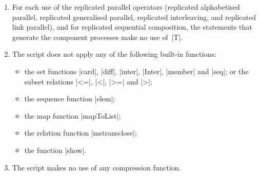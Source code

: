 \begin{definition}
\begin{enumerate}
\item\label{item:indexing} For each use of the replicated parallel operators
  (replicated alphabetised parallel, replicated generalised parallel,
  replicated interleaving, and replicated link parallel), and for replicated
  sequential composition, the statements that generate the component processes
  make no use of~|T|. 


\item\label{item:built-in-functions} The script does not apply any of the
  following built-in functions:
  \begin{itemize}
    \item the set functions |card|, |diff|, |inter|, |Inter|, |member| and
      |seq|; or the subset relations |<=|, |<|, |>=| and |>|;

    \item the sequence function |elem|;

    \item the map function |mapToList|;

    \item the relation function |mstransclose|;

    \item the function |show|.
  \end{itemize}

\item The script makes no use of any compression function.
\end{enumerate}
\end{definition}
